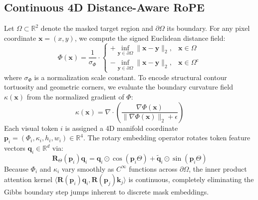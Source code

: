 \documentclass[11pt,a4paper]{article}
\begin{document}
\subsection{Continuous 4D Distance-Aware RoPE}
\label{sec:continuous_rope}
Let $\Omega \subset \mathbb{R}^2$ denote the masked target region and $\partial \Omega$ its boundary. For any pixel coordinate $\mathbf{x} = (x, y)$, we compute the signed Euclidean distance field:
\begin{equation}
    \Phi(\mathbf{x}) = \frac{1}{\sigma_\Phi} \cdot 
    \begin{cases} 
        +\inf_{\mathbf{y} \in \partial \Omega} \|\mathbf{x} - \mathbf{y}\|_2, & \mathbf{x} \in \Omega \\ 
        -\inf_{\mathbf{y} \in \partial \Omega} \|\mathbf{x} - \mathbf{y}\|_2, & \mathbf{x} \in \Omega^{\text{c}} 
    \end{cases}
\end{equation}
where $\sigma_\Phi$ is a normalization scale constant. To encode structural contour tortuosity and geometric corners, we evaluate the boundary curvature field $\kappa(\mathbf{x})$ from the normalized gradient of $\Phi$:
\begin{equation}
    \kappa(\mathbf{x}) = \nabla \cdot \left( \frac{\nabla \Phi(\mathbf{x})}{\|\nabla \Phi(\mathbf{x})\|_2 + \epsilon} \right)
\end{equation}
Each visual token $i$ is assigned a 4D manifold coordinate $\mathbf{p}_i = (\Phi_i, \kappa_i, h_i, w_i) \in \mathbb{R}^4$. The rotary embedding operator rotates token feature vectors $\mathbf{q}_i \in \mathbb{R}^d$ via:
\begin{equation}
    \mathbf{R}_{\Theta}(\mathbf{p}_i)\mathbf{q}_i = \mathbf{q}_i \odot \cos(\mathbf{p}_i \Theta) + \tilde{\mathbf{q}}_i \odot \sin(\mathbf{p}_i \Theta)
\end{equation}
Because $\Phi_i$ and $\kappa_i$ vary smoothly as $C^\infty$ functions across $\partial \Omega$, the inner product attention kernel $\langle \mathbf{R}(\mathbf{p}_i)\mathbf{q}_i, \mathbf{R}(\mathbf{p}_j)\mathbf{k}_j \rangle$ is continuous, completely eliminating the Gibbs boundary step jumps inherent to discrete mask embeddings.
\end{document}
